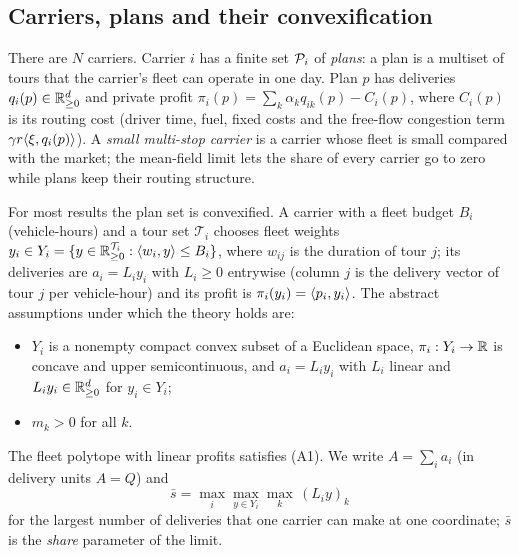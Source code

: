 \subsection{Carriers, plans and their convexification}\label{sec:carriers}
There are $N$ carriers. Carrier $i$ has a finite set $\mathcal{P}_i$ of \emph{plans}: a plan is a multiset of tours that the carrier's fleet can operate in one day. Plan $p$ has deliveries $q_i(p)\in\mathbb{R}^d_{\ge0}$ and private profit $\pi_i(p)=\sum_k\alpha_kq_{ik}(p)-C_i(p)$, where $C_i(p)$ is its routing cost (driver time, fuel, fixed costs and the free-flow congestion term $\gamma r\langle \xi,q_i(p)\rangle$). A \emph{small multi-stop carrier} is a carrier whose fleet is small compared with the market; the mean-field limit lets the share of every carrier go to zero while plans keep their routing structure.

For most results the plan set is convexified. A carrier with a fleet budget $B_i$ (vehicle-hours) and a tour set $\mathcal T_i$ chooses fleet weights $y_i\in Y_i=\{y\in\mathbb{R}^{\mathcal T_i}_{\ge0}:\langle w_i,y\rangle\le B_i\}$, where $w_{ij}$ is the duration of tour $j$; its deliveries are $a_i=L_iy_i$ with $L_i\ge0$ entrywise (column $j$ is the delivery vector of tour $j$ per vehicle-hour) and its profit is $\pi_i(y_i)=\langle p_i,y_i\rangle$. The abstract assumptions under which the theory holds are:
\begin{itemize}
\item[(A1)] $Y_i$ is a nonempty compact convex subset of a Euclidean space, $\pi_i:Y_i\to\mathbb{R}$ is concave and upper semicontinuous, and $a_i=L_iy_i$ with $L_i$ linear and $L_iy_i\in\mathbb{R}^d_{\ge0}$ for $y_i\in Y_i$;
\item[(A2)] $m_k>0$ for all $k$.
\end{itemize}
The fleet polytope with linear profits satisfies (A1). We write $A=\sum_ia_i$ (in delivery units $A=Q$) and
\[
\bar s=\max_i\max_{y\in Y_i}\max_k\,(L_iy)_k
\]
for the largest number of deliveries that one carrier can make at one coordinate; $\bar s$ is the \emph{share} parameter of the limit.

